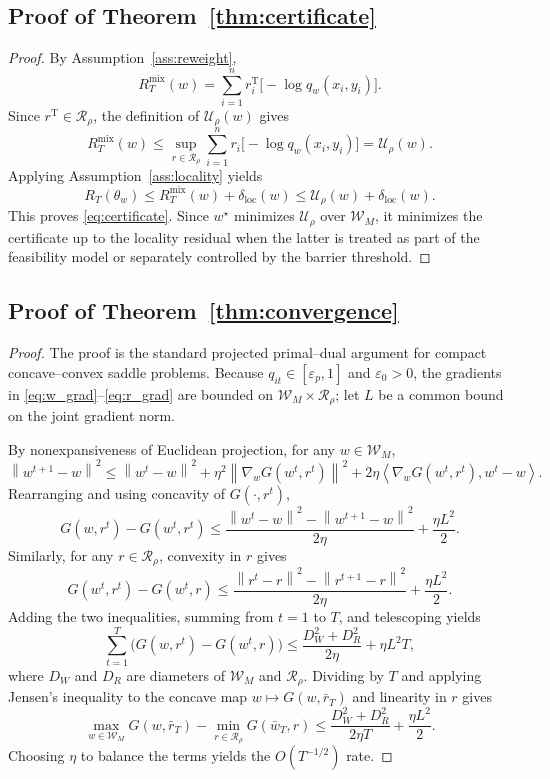 \documentclass{article}
\newcommand{\cR}{\mathcal{R}}
\newcommand{\cW}{\mathcal{W}}
\newcommand{\norm}[1]{\left\lVert #1 \right\rVert}
\newcommand{\inner}[2]{\left\langle #1, #2 \right\rangle}
\newcommand{\eps}{\varepsilon}
\begin{document}
\subsection{Proof of Theorem~\ref{thm:certificate}}

\begin{proof}
By Assumption~\ref{ass:reweight},
\[
    R_T^{\mathrm{mix}}(w)
    =
    \sum_{i=1}^{n} r_i^{\mathrm{T}}
    \Big[
        -\log q_w(x_i,y_i)
    \Big].
\]
Since \(r^{\mathrm{T}}\in\cR_\rho\), the definition of \(\mathcal{U}_\rho(w)\) gives
\[
    R_T^{\mathrm{mix}}(w)
    \le
    \sup_{r\in\cR_\rho}
    \sum_{i=1}^{n} r_i
    \Big[
        -\log q_w(x_i,y_i)
    \Big]
    =
    \mathcal{U}_\rho(w).
\]
Applying Assumption~\ref{ass:locality} yields
\[
    R_T(\theta_w)
    \le
    R_T^{\mathrm{mix}}(w) + \delta_{\mathrm{loc}}(w)
    \le
    \mathcal{U}_\rho(w) + \delta_{\mathrm{loc}}(w).
\]
This proves \eqref{eq:certificate}. Since \(w^\star\) minimizes \(\mathcal{U}_\rho\) over \(\cW_M\), it minimizes the certificate up to the locality residual when the latter is treated as part of the feasibility model or separately controlled by the barrier threshold.
\end{proof}

\subsection{Proof of Theorem~\ref{thm:convergence}}

\begin{proof}
The proof is the standard projected primal--dual argument for compact concave--convex saddle problems. Because \(q_{it}\in[\eps_p,1]\) and \(\eps_0>0\), the gradients in \eqref{eq:w_grad}--\eqref{eq:r_grad} are bounded on \(\cW_M\times\cR_\rho\); let \(L\) be a common bound on the joint gradient norm.

By nonexpansiveness of Euclidean projection, for any \(w\in\cW_M\),
\[
    \norm{w^{t+1}-w}^2
    \le
    \norm{w^t-w}^2
    + \eta^2 \norm{\nabla_w G(w^t,r^t)}^2
    + 2\eta \inner{\nabla_w G(w^t,r^t)}{w^t-w}.
\]
Rearranging and using concavity of \(G(\cdot,r^t)\),
\[
    G(w,r^t) - G(w^t,r^t)
    \le
    \frac{\norm{w^t-w}^2 - \norm{w^{t+1}-w}^2}{2\eta}
    +
    \frac{\eta L^2}{2}.
\]
Similarly, for any \(r\in\cR_\rho\), convexity in \(r\) gives
\[
    G(w^t,r^t) - G(w^t,r)
    \le
    \frac{\norm{r^t-r}^2 - \norm{r^{t+1}-r}^2}{2\eta}
    +
    \frac{\eta L^2}{2}.
\]
Adding the two inequalities, summing from \(t=1\) to \(T\), and telescoping yields
\[
    \sum_{t=1}^{T}
    \Big(
        G(w,r^t) - G(w^t,r)
    \Big)
    \le
    \frac{D_W^2 + D_R^2}{2\eta}
    +
    \eta L^2 T,
\]
where \(D_W\) and \(D_R\) are diameters of \(\cW_M\) and \(\cR_\rho\). Dividing by \(T\) and applying Jensen's inequality to the concave map \(w\mapsto G(w,\bar r_T)\) and linearity in \(r\) gives
\[
    \max_{w\in\cW_M} G(w,\bar r_T)
    -
    \min_{r\in\cR_\rho} G(\bar w_T,r)
    \le
    \frac{D_W^2 + D_R^2}{2\eta T}
    +
    \frac{\eta L^2}{2}.
\]
Choosing \(\eta\) to balance the terms yields the \(O(T^{-1/2})\) rate.
\end{proof}
\end{document}
